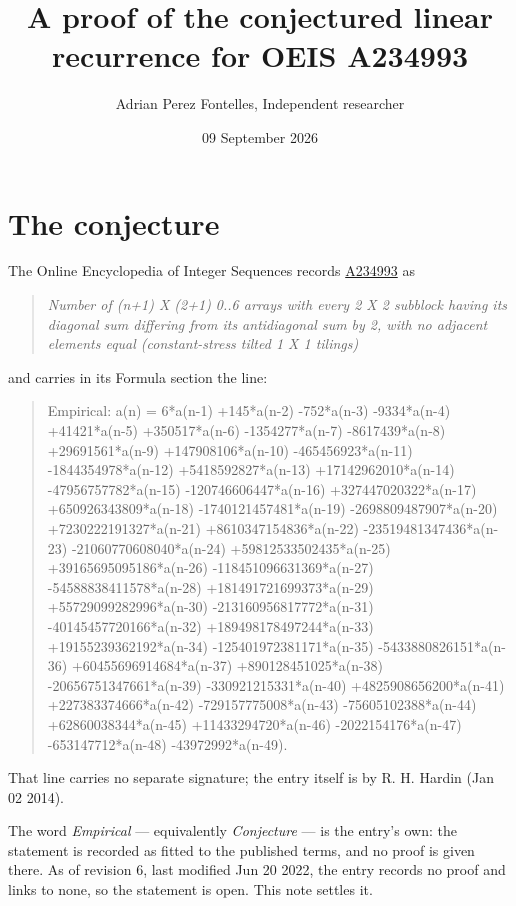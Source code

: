 \documentclass[11pt]{article}
\title{A proof of the conjectured linear recurrence for OEIS A234993}
\author{Adrian Perez Fontelles, Independent researcher}
\date{09 September 2026}
\theoremstyle{definition}
\begin{document}
\maketitle
\section{The conjecture}

The Online Encyclopedia of Integer Sequences records \href{https://oeis.org/A234993}{A234993} as

\begin{quote}\itshape Number of (n+1) X (2+1) 0..6 arrays with every 2 X 2 subblock having its diagonal sum differing from its antidiagonal sum by 2, with no adjacent elements equal (constant-stress tilted 1 X 1 tilings)\end{quote}

and carries in its Formula section the line:

\begin{quote}\ttfamily Empirical: a(n) = 6*a(n-1) +145*a(n-2) -752*a(n-3) -9334*a(n-4) +41421*a(n-5) +350517*a(n-6) -1354277*a(n-7) -8617439*a(n-8) +29691561*a(n-9) +147908106*a(n-10) -465456923*a(n-11) -1844354978*a(n-12) +5418592827*a(n-13) +17142962010*a(n-14) -47956757782*a(n-15) -120746606447*a(n-16) +327447020322*a(n-17) +650926343809*a(n-18) -1740121457481*a(n-19) -2698809487907*a(n-20) +7230222191327*a(n-21) +8610347154836*a(n-22) -23519481347436*a(n-23) -21060770608040*a(n-24) +59812533502435*a(n-25) +39165695095186*a(n-26) -118451096631369*a(n-27) -54588838411578*a(n-28) +181491721699373*a(n-29) +55729099282996*a(n-30) -213160956817772*a(n-31) -40145457720166*a(n-32) +189498178497244*a(n-33) +19155239362192*a(n-34) -125401972381171*a(n-35) -5433880826151*a(n-36) +60455696914684*a(n-37) +890128451025*a(n-38) -20656751347661*a(n-39) -330921215331*a(n-40) +4825908656200*a(n-41) +227383374666*a(n-42) -729157775008*a(n-43) -75605102388*a(n-44) +62860038344*a(n-45) +11433294720*a(n-46) -2022154176*a(n-47) -653147712*a(n-48) -43972992*a(n-49).\end{quote}

That line carries no separate signature; the entry itself is by R. H. Hardin (Jan 02 2014).

The word {\itshape Empirical} --- equivalently {\itshape Conjecture} --- is the entry's own: the statement is recorded as fitted to the published terms, and no proof is given there. As of revision 6, last modified Jun 20 2022, the entry records no proof and links to none, so the statement is open. This note settles it.
\end{document}
